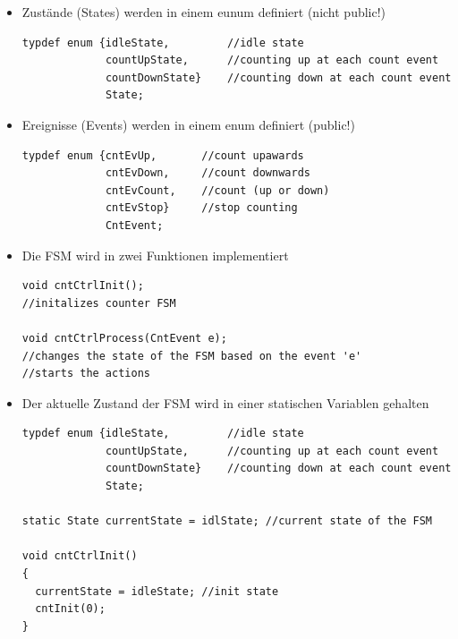 \begin{itemize}
  \item Zustände (States) werden in einem eunum definiert (nicht public!)
\begin{lstlisting}
typdef enum {idleState,         //idle state
             countUpState,      //counting up at each count event
             countDownState}    //counting down at each count event
             State;
\end{lstlisting}
\item Ereignisse (Events) werden in einem enum definiert (public!)
\begin{lstlisting}
typdef enum {cntEvUp,       //count upawards
             cntEvDown,     //count downwards
             cntEvCount,    //count (up or down)
             cntEvStop}     //stop counting
             CntEvent;
\end{lstlisting}
\item Die FSM wird in zwei Funktionen implementiert
\begin{lstlisting}
void cntCtrlInit();
//initalizes counter FSM

void cntCtrlProcess(CntEvent e);
//changes the state of the FSM based on the event 'e'
//starts the actions
\end{lstlisting}


\item Der aktuelle Zustand der FSM wird in einer statischen Variablen gehalten
\begin{lstlisting}
typdef enum {idleState,         //idle state
             countUpState,      //counting up at each count event
             countDownState}    //counting down at each count event
             State;
             
static State currentState = idlState; //current state of the FSM

void cntCtrlInit()
{
  currentState = idleState; //init state
  cntInit(0);
}
\end{lstlisting}

\end{itemize}

